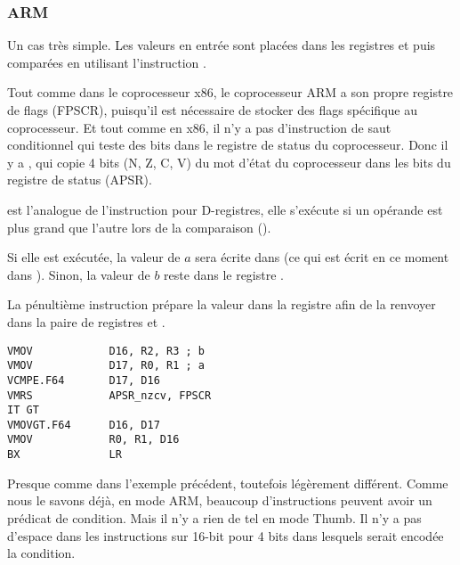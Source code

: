 \subsubsection{ARM}

\myparagraph{\OptimizingXcodeIV (\ARMMode)}



Un cas très simple.
Les valeurs en entrée sont placées dans les registres  et  puis
comparées en utilisant l'instruction .

Tout comme dans le coprocesseur x86, le coprocesseur ARM a son propre registre de
flags (\ac{FPSCR}), puisqu'il est nécessaire de stocker des flags spécifique au coprocesseur.
Et tout comme en x86, il n'y a pas d'instruction de saut conditionnel qui teste des
bits dans le registre de status du coprocesseur.
Donc il y a , qui copie 4 bits (N, Z, C, V) du mot d'état du coprocesseur
dans les bits du registre de status  (\ac{APSR}).

 est l'analogue de l'instruction  pour D-registres, elle s'exécute
si un opérande est plus grand que l'autre lors de la comparaison ().

Si elle est exécutée, la valeur de $a$ sera écrite dans  (ce qui est écrit
en ce moment dans ).
Sinon, la valeur de $b$ reste dans le registre .


La pénultième instruction  prépare la valeur dans la registre 
afin de la renvoyer dans la paire de registres  et .

\myparagraph{\OptimizingXcodeIV (\ThumbTwoMode)}

\begin{lstlisting}[caption=\OptimizingXcodeIV (\ThumbTwoMode),style=customasmARM]
VMOV            D16, R2, R3 ; b
VMOV            D17, R0, R1 ; a
VCMPE.F64       D17, D16
VMRS            APSR_nzcv, FPSCR
IT GT 
VMOVGT.F64      D16, D17
VMOV            R0, R1, D16
BX              LR
\end{lstlisting}

Presque comme dans l'exemple précédent, toutefois légèrement différent.
Comme nous le savons déjà, en mode ARM, beaucoup d'instructions peuvent avoir un
prédicat de condition.
Mais il n'y a rien de tel en mode Thumb.
Il n'y a pas d'espace dans les instructions sur 16-bit pour 4 bits dans lesquels
serait encodée la condition.

